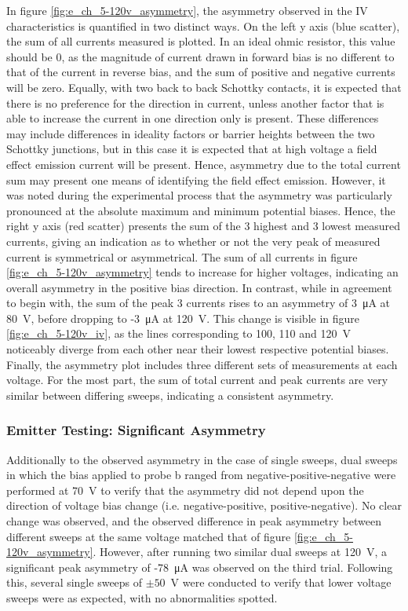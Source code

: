 \begin{refsection}
In figure \ref{fig:e_ch_5-120v_asymmetry}, the asymmetry observed in the IV characteristics is quantified in two distinct ways. On the left y axis (blue scatter), the sum of all currents measured is plotted. In an ideal ohmic resistor, this value should be 0, as the magnitude of current drawn in forward bias is no different to that of the current in reverse bias, and the sum of positive and negative currents will be zero. Equally, with two back to back Schottky contacts, it is expected that there is no preference for the direction in current, unless another factor that is able to increase the current in one direction only is present. These differences may include differences in ideality factors or barrier heights between the two Schottky junctions, but in this case it is expected that at high voltage a field effect emission current will be present. Hence, asymmetry due to the total current sum may present one means of identifying the field effect emission. However, it was noted during the experimental process that the asymmetry was particularly pronounced at the absolute maximum and minimum potential biases. Hence, the right y axis (red scatter) presents the sum of the 3 highest and 3 lowest measured currents, giving an indication as to whether or not the very peak of measured current is symmetrical or asymmetrical. The sum of all currents in figure \ref{fig:e_ch_5-120v_asymmetry} tends to increase for higher voltages, indicating an overall asymmetry in the positive bias direction. In contrast, while in agreement to begin with, the sum of the peak 3 currents rises to an asymmetry of 3~\si{\micro\ampere} at 80~\si{\volt}, before dropping to -3~\si{\micro\ampere} at 120~\si{\volt}. This change is visible in figure \ref{fig:e_ch_5-120v_iv}, as the lines corresponding to 100, 110 and 120~\si{\volt} noticeably diverge from each other near their lowest respective potential biases. Finally, the asymmetry plot includes three different sets of measurements at each voltage. For the most part, the sum of total current and peak currents are very similar between differing sweeps, indicating a consistent asymmetry.

\subsubsection{Emitter Testing: Significant Asymmetry}
Additionally to the observed asymmetry in the case of single sweeps, dual sweeps in which the bias applied to probe b ranged from negative-positive-negative were performed at 70~\si{\volt} to verify that the asymmetry did not depend upon the direction of voltage bias change (i.e. negative-positive, positive-negative). No clear change was observed, and the observed difference in peak asymmetry between different sweeps at the same voltage matched that of figure \ref{fig:e_ch_5-120v_asymmetry}. However, after running two similar dual sweeps at 120~\si{\volt}, a significant peak asymmetry of -78~\si{\micro\ampere} was observed on the third trial. Following this, several single sweeps of $\pm50$~\si{\volt} were conducted to verify that lower voltage sweeps were as expected, with no abnormalities spotted.


\end{refsection}
